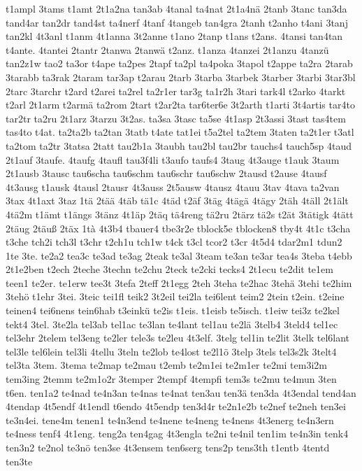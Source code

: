 {t1ampl
3tams
t1amt
2t1a2na
tan3ab
4tanal
ta4nat
2t1a4nä
2tanb
3tanc
tan3da
tand4ar
tan2dr
tand4st
ta4nerf
4tanf
4tangeb
tan4gra
2tanh
t2anho
t4ani
3tanj
tan2kl
4t3anl
t1anm
4t1anna
3t2anne
t1ano
2tanp
t1ans
t2ans.
4tansi
tan4tan
t4ante.
4tantei
2tantr
2tanwa
2tanwä
t2anz.
t1anza
4tanzei
2t1anzu
4tanzü
tan2z1w
tao2
ta3or
t4ape
ta2pes
2tapf
ta2pl
ta4poka
3tapol
t2appe
ta2ra
2tarab
3tarabb
ta3rak
2taram
tar3ap
t2arau
2tarb
3tarba
3tarbek
3tarber
3tarbi
3tar3bl
2tarc
3tarchr
t2ard
t2arei
ta2rel
ta2r1er
tar3g
ta1r2h
3tari
tark4l
t2arko
4tarkt
t2arl
2t1arm
t2armä
ta2rom
2tart
t2ar2ta
tar6ter6e
3t2arth
t1arti
3t4artis
tar4to
tar2tr
ta2ru
2t1arz
3tarzu
3t2as.
ta3sa
3tasc
ta5se
4t1asp
2t3assi
3tast
tas4tem
tas4to
t4at.
ta2ta2b
ta2tan
3tatb
t4ate
tat1ei
t5a2tel
ta2tem
3taten
ta2t1er
t3atl
ta2tom
ta2tr
3tatsa
2tatt
tau2b1a
3taubh
tau2bl
tau2br
tauchs4
tauch5sp
4taud
2t1auf
3taufe.
4taufg
4taufl
tau3f4li
t3aufo
taufs4
3taug
4t3auge
t1auk
3taum
2t1ausb
3tausc
tau6scha
tau6schm
tau6schr
tau6schw
2tausd
t2ause
4tausf
4t3ausg
t1ausk
4tausl
2tausr
4t3auss
2t5ausw
4tausz
4tauu
3tav
4tava
ta2van
3tax
4t1axt
3taz
1tä
2tää
4täb
tä1c
4täd
t2äf
3täg
4tägä
4tägy
2täh
4täll
2t1ält
4tä2m
t1ämt
t1ängs
3tänz
4t1äp
2täq
tä4reng
tä2ru
2tärz
tä2s
t2ät
3tätigk
4tätt
2täug
2täuß
2täx
1tà
4t3b4
tbauer4
tbe3r2e
tblock5e
tblocken8
tby4t
4t1c
t3cha
t3che
tch2i
tch3l
t3chr
t2ch1u
tch1w
t4ck
t3cl
tcor2
t3cr
4t5d4
tdar2m1
tdun2
1te
3te.
te2a2
tea3c
te3ad
te3ag
2teak
te3al
3team
te3an
te3ar
tea4s
3teba
t4ebb
2t1e2ben
t2ech
2teche
3techn
te2chu
2teck
te2cki
tecks4
2t1ecu
te2dit
te1em
teen1
te2er.
te1erw
tee3t
3tefa
2teff
2t1egg
2teh
3teha
te2hac
3tehä
3tehi
te2him
3tehö
t1ehr
3tei.
3teic
tei1fl
teik2
3t2eil
tei2la
tei6lent
teim2
2tein
t2ein.
t2eine
teinen4
tei6nens
tein6hab
t3einkü
te2is
t1eis.
t1eisb
te5isch.
t1eiw
tei3z
te2kel
tekt4
3tel.
3te2la
tel3ab
tel1ac
te3lan
te4lant
tel1au
te2lä
3telb4
3teld4
tel1ec
tel3ehr
2telem
tel3eng
te2ler
tele3s
te2leu
4t3elf.
3telg
tel1in
te2lit
3telk
tel6lant
tel3le
tel6lein
tel3li
4tellu
3teln
te2lob
te4lost
te2l1ö
3telp
3tels
tel3s2k
3telt4
tel3ta
3tem.
3tema
te2map
te2mau
t2emb
te2m1ei
te2m1er
te2mi
tem3i2m
tem3ing
2temm
te2m1o2r
3temper
2tempf
4tempfi
tem3s
te2mu
te4mun
3ten
t6en.
ten1a2
te4nad
te4n3an
te4nas
te4nat
ten3au
ten3ä
ten3da
4t3endal
tend4an
4tendap
4t5endf
4t1endl
t6endo
4t5endp
ten3d4r
te2n1e2b
te2nef
te2neh
ten3ei
te3n4ei.
tene4m
tenen1
te4n3end
te4nene
te4neng
te4nens
4t3energ
te4n3ern
te4ness
tenf4
4t1eng.
teng2a
ten4gag
4t3engla
te2ni
te4nil
ten1im
te4n3in
tenk4
ten3n2
te2nol
te3nö
ten3se
4t3ensem
ten6serg
tens2p
tens3th
t1entb
4tentd
ten3te
}
